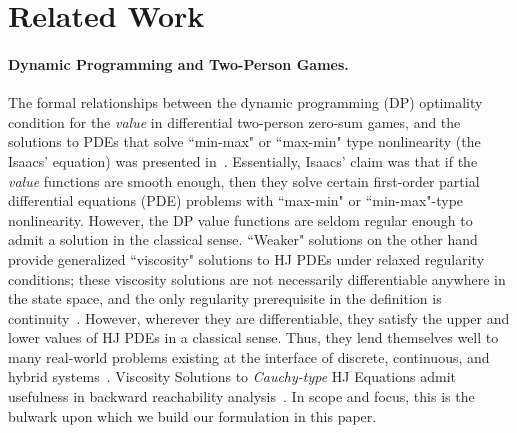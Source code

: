 \section{Related Work}

\paragraph{Dynamic Programming and Two-Person Games.}
The formal relationships between the dynamic programming (DP) optimality condition for the \textit{value} in differential two-person zero-sum games, and the solutions to PDEs that solve ``min-max" or ``max-min" type nonlinearity (the Isaacs' equation) was presented in~\citet{Isaacs1965}. 
Essentially, Isaacs' claim was that if the \textit{value} functions are smooth enough, then they solve certain first-order partial differential equations (PDE) problems with  ``max-min" or ``min-max"-type nonlinearity.  
However, the DP value functions are seldom regular enough to admit a solution in the classical sense.  
``Weaker" solutions on the other hand~\citet{Lions1982, Evans1984, Crandall1984, CrandallLaxFriedrichs, Souganidis} provide generalized ``viscosity" solutions to HJ PDEs under relaxed regularity conditions; these viscosity solutions are not necessarily differentiable anywhere in the state space, and the only regularity prerequisite in the definition is continuity~\citet{Crandall1983viscosity}. 
However, wherever they are differentiable, they satisfy the  upper and lower values of HJ PDEs in a classical sense. 
Thus, they lend themselves well to many real-world problems existing at the interface of discrete, continuous, and hybrid systems~\citet{LygerosReachability, OsherFronts, Mitchell2020, Souganidis, Mitchell2005}. 
Viscosity Solutions to \textit{Cauchy-type} HJ Equations admit usefulness in backward reachability analysis~\citet{Mitchell2005}. 
In scope and focus, this is the bulwark upon which we build our formulation in this paper.


